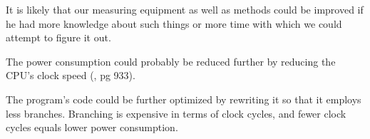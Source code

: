 It is likely that our measuring equipment as well as methods could be improved if he had more knowledge about such things or more time with which we could attempt to figure it out.

The power consumption could probably be reduced further by reducing the CPU's clock speed (\cite{AT32AP7000-prelim}, pg 933).

The program's code could be further optimized by rewriting it so that it employs less branches. Branching is expensive in terms of clock cycles, and fewer clock cycles equals lower power consumption.
